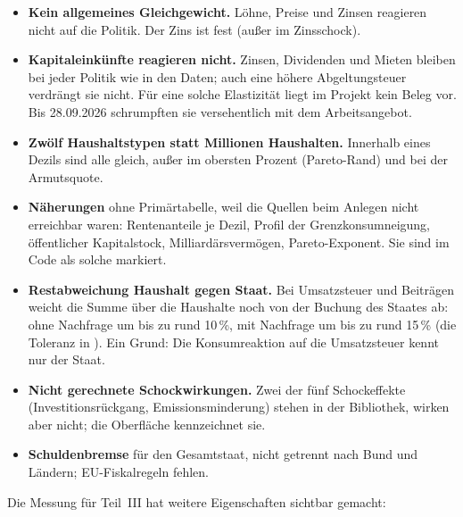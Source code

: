 \begin{itemize}
\item \textbf{Kein allgemeines Gleichgewicht.} Löhne, Preise und Zinsen reagieren nicht auf
  die Politik. Der Zins ist fest (außer im Zinsschock).
\item \textbf{Kapitaleinkünfte reagieren nicht.} Zinsen, Dividenden und Mieten bleiben bei
  jeder Politik wie in den Daten; auch eine höhere Abgeltungsteuer verdrängt sie nicht. Für eine
  solche Elastizität liegt im Projekt kein Beleg vor. Bis 28.09.2026 schrumpften sie
  versehentlich mit dem Arbeitsangebot.
\item \textbf{Zwölf Haushaltstypen statt Millionen Haushalten.} Innerhalb eines Dezils sind
  alle gleich, außer im obersten Prozent (Pareto-Rand) und bei der Armutsquote.
\item \textbf{Näherungen} ohne Primärtabelle, weil die Quellen beim Anlegen nicht erreichbar
  waren: Rentenanteile je Dezil, Profil der Grenzkonsumneigung, öffentlicher Kapitalstock,
  Milliardärsvermögen, Pareto-Exponent. Sie sind im Code als solche markiert.
\item \textbf{Restabweichung Haushalt gegen Staat.} Bei Umsatzsteuer und Beiträgen weicht die
  Summe über die Haushalte noch von der Buchung des Staates ab: ohne Nachfrage um bis zu rund
  10\,\%, mit Nachfrage um bis zu rund 15\,\% (die Toleranz in ).
  Ein Grund: Die Konsumreaktion auf die Umsatzsteuer kennt nur der Staat.
\item \textbf{Nicht gerechnete Schockwirkungen.} Zwei der fünf Schockeffekte
  (Investitionsrückgang, Emissionsminderung) stehen in der Bibliothek, wirken aber nicht; die
  Oberfläche kennzeichnet sie.
\item \textbf{Schuldenbremse} für den Gesamtstaat, nicht getrennt nach Bund und Ländern;
  EU-Fiskalregeln fehlen.
\end{itemize}

Die Messung für Teil~III hat weitere Eigenschaften sichtbar gemacht:

